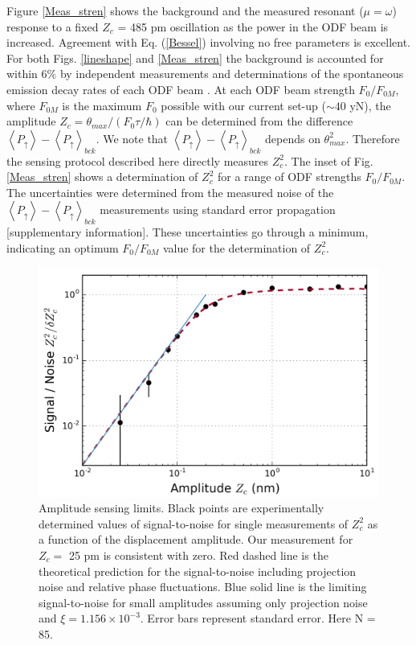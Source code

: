 \documentclass[aps,prl,twocolumn,superscriptaddress,floatfix,nofootinbib]{revtex4-1}
\begin{document}
Figure \ref{Meas_stren} shows the background and the measured resonant ($\mu=\omega$) response to a fixed $Z_c$ = 485 pm oscillation as the power in the ODF beam is increased. Agreement with Eq. (\ref{Bessel}) involving no free parameters is excellent. For both Figs. \ref{lineshape} and \ref{Meas_stren} the background is accounted for within $6\%$ by independent measurements and determinations of the spontaneous emission decay rates of each ODF beam \citep{Britton2012}. At each ODF beam strength $F_{0}/F_{0M}$, where $F_{0M}$ is the maximum $F_0$ possible with our current set-up ($\sim 40$ yN), the amplitude $Z_c=\theta_{max}/(F_{0}\tau/\hbar)$ can be determined from the difference $\left< P_\uparrow \right>- \left< P_\uparrow \right>_{bck}$. We note that $\left< P_\uparrow \right>- \left< P_\uparrow \right>_{bck}$ depends on $\theta_{max}^2$. Therefore the sensing protocol described here directly measures $Z_c^2$. The inset of Fig. \ref{Meas_stren} shows a determination of $Z_c^2$ for a range of ODF strengths $F_{0}/F_{0M}$. The uncertainties were determined from the measured noise of the $\left< P_\uparrow \right>- \left< P_\uparrow \right>_{bck}$ measurements using standard error propagation [supplementary information]. These uncertainties go through a minimum, indicating an optimum $F_{0}/F_{0M}$ value for the determination of $Z_c^2$.

\begin{figure}
\includegraphics[width=.45\textwidth]{sensing_limit}
\caption{Amplitude sensing limits. Black points are experimentally determined values of signal-to-noise for single measurements of $Z_{c}^{2}$ as a function of the displacement amplitude. Our measurement for $Z_c =$ 25 pm is consistent with zero. Red dashed line is the theoretical prediction for the signal-to-noise including projection noise and relative phase fluctuations. Blue solid line is the limiting signal-to-noise for small amplitudes assuming only projection noise and $\xi=1.156\times10^{-3}$. Error bars represent standard error. Here N = 85.}\label{Fig_sens}
\end{figure}
\end{document}
